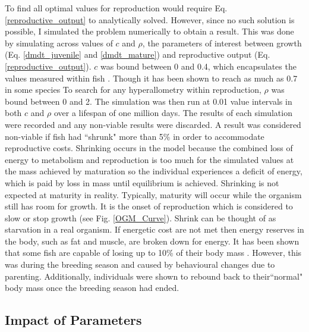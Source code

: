 \documentclass[a4paper, 11pt, hidelinks]{article} %
\begin{document}
	To find all optimal values for reproduction would require Eq. \ref{reproductive_output} to analytically solved.  However, since no such solution is possible, I simulated the problem numerically to obtain a result.  This was done by simulating across values of $ c $ and $ \rho $, the parameters of interest between growth (Eq. \ref{dmdt_juvenile} and \ref{dmdt_mature}) and reproductive output (Eq. \ref{reproductive_output}).  $ c $ was bound between 0 and 0.4, which encapsulates the values measured within fish \parencite{Benoit2018, Roff1983, Fontoura2009}.  Though it has been shown to reach as much as 0.7 in some species \parencite{Parker2018}  To search for any hyperallometry within reproduction, $ \rho $ was bound between 0 and 2.  
	The simulation was then run at 0.01 value intervals in both $c$ and $\rho$ over a lifespan of one million days.  The results of each simulation were recorded and any non-viable results were discarded.  A result was considered non-viable if fish had ``shrunk" more than 5\% in order to accommodate reproductive costs.  Shrinking occurs in the model because  the combined loss of energy to metabolism and reproduction is too much for the simulated values at the mass achieved by maturation so the individual experiences a deficit of energy, which is paid by loss in mass until equilibrium is achieved. %
	Shrinking is not expected at maturity in reality.  Typically, maturity will occur while the organism still has room for growth.  It is the onset of reproduction which is considered to slow or stop growth %
	 (see Fig. \ref{OGM_Curve}).  Shrink can be thought of as starvation in a real organism.  If energetic cost are not met then energy reserves in the body, such as fat and muscle, are broken down for energy.  It has been shown that some fish are capable of losing up to 10\% of their body mass \parencite{VandenBerghe1992}.  However, this was during the breeding season and caused by behavioural changes due to parenting.  Additionally, individuals were shown to rebound back to their``normal" body mass once the breeding season had ended.
	
	\subsection{Impact of Parameters}
\end{document}
